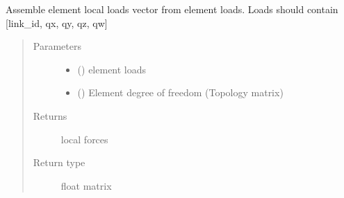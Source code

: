 \documentclass[letterpaper,10pt,english]{sphinxmanual}
\begin{document}
\begin{fulllineitems}
\label{\detokenize{api:beamon.core.assemble_element_loads}}
Assemble element local loads vector from element loads.
Loads should contain {[}link\_id, qx, qy, qz, qw{]}
\begin{quote}\begin{description}
\item[{Parameters}] \leavevmode\begin{itemize}
\item {} 
 () \textendash{} element loads

\item {} 
 () \textendash{} Element degree of freedom (Topology matrix)

\end{itemize}

\item[{Returns}] \leavevmode
local forces

\item[{Return type}] \leavevmode
float matrix

\end{description}\end{quote}

\end{fulllineitems}

\end{document}
